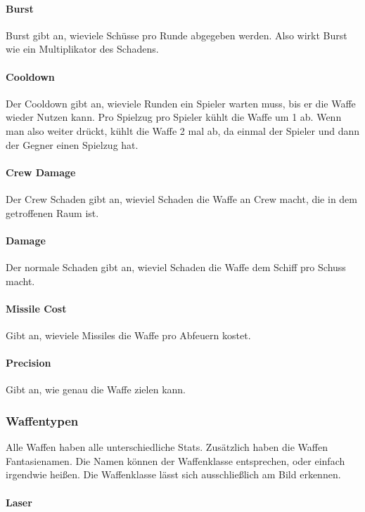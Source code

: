 \documentclass[fontsize=12pt,paper=a4,twoside]{scrartcl}
\begin{document}
\paragraph{Burst}
Burst gibt an, wieviele Schüsse pro Runde abgegeben werden. Also wirkt Burst wie ein Multiplikator des Schadens. 

\paragraph{Cooldown} 
Der Cooldown gibt an, wieviele Runden ein Spieler warten muss, bis er die Waffe wieder Nutzen kann. Pro Spielzug pro Spieler kühlt die Waffe um 1 ab. Wenn man also weiter drückt, kühlt die Waffe 2 mal ab, da einmal der Spieler und dann der Gegner einen Spielzug hat. 

\paragraph{Crew Damage}
Der Crew Schaden gibt an, wieviel Schaden die Waffe an Crew macht, die in dem getroffenen Raum ist. 

\paragraph{Damage}

Der normale Schaden gibt an, wieviel Schaden die Waffe dem Schiff pro Schuss macht. 

\paragraph{Missile Cost}

Gibt an, wieviele Missiles die Waffe pro Abfeuern kostet. 

\paragraph{Precision} Gibt an, wie genau die Waffe zielen kann.

\subsubsection{Waffentypen}

Alle Waffen haben alle unterschiedliche Stats. Zusätzlich haben die Waffen Fantasienamen. Die Namen können der Waffenklasse entsprechen, oder einfach irgendwie heißen. Die Waffenklasse lässt sich ausschließlich am Bild erkennen. 

\paragraph{Laser}
\end{document}
